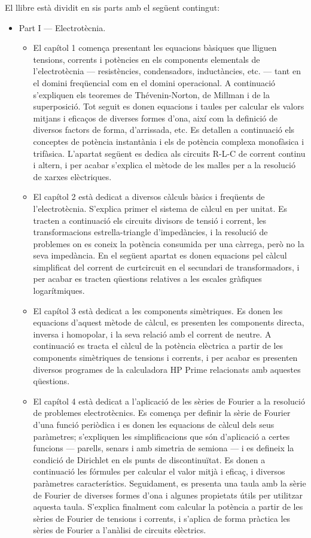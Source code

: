 	El llibre està dividit en sis parts amb el següent contingut:
	\begin{itemize}
		\item Part I --- Electrotècnia. 
		\begin{itemize}
			\item El capítol 1 comença presentant les equacions bàsiques que lliguen tensions, corrents i potències en els components elementals de l'electrotècnia --- resistències, condensadors, inductàncies, etc. --- tant en el domini freqüencial com en el domini operacional. A continuació s'expliquen els teoremes de Thévenin-Norton, de Millman i de la superposició. Tot seguit es donen equacions i taules per calcular els valors mitjans i eficaços de diverses formes d'ona, així com la definició de diversos factors de forma, d'arrissada, etc. Es detallen a continuació els conceptes de potència instantània i els de potència complexa monofàsica i trifàsica. L'apartat següent es dedica  als circuits R-L-C de corrent continu i altern, i per acabar s'explica el mètode de les malles per a la resolució de xarxes elèctriques.
			\item El capítol 2 està dedicat a diversos càlculs bàsics i freqüents de l'electrotècnia. S'explica primer el sistema de càlcul en per unitat. Es tracten a continuació els circuits  divisors de tensió i corrent,  les transformacions estrella-triangle d'impedàncies, i la resolució de problemes on es coneix la potència consumida per una càrrega, però no la seva impedància. En el següent apartat es donen equacions pel càlcul simplificat del corrent de curtcircuit en el secundari de transformadors, i per acabar es tracten  qüestions relatives a les  escales gràfiques logarítmiques.
			\item El capítol 3 està dedicat a les components simètriques. Es donen les equacions d'aquest mètode de càlcul, es presenten les components directa, inversa i homopolar, i la seva relació amb el corrent de neutre. A continuació es tracta el càlcul de la potència elèctrica a partir de les components simètriques de tensions i corrents, i per acabar es presenten diversos programes de la calculadora \textsf{HP Prime} relacionats amb aquestes qüestions.
			\item El capítol 4 està dedicat a l'aplicació de les sèries de Fourier a la resolució de problemes electrotècnics. Es comença per definir la sèrie de Fourier d'una funció periòdica i es donen les equacions de càlcul dels seus paràmetres; s'expliquen  les simplificacions que són d'aplicació a certes funcions --- parells, senars i amb simetria de semiona --- i es defineix la condició de Dirichlet en els punts de discontinuïtat. Es donen a continuació les fórmules per calcular el valor mitjà i eficaç, i diversos paràmetres característics. Seguidament, es presenta una taula amb la sèrie de Fourier de diverses formes d'ona i algunes propietats útils per utilitzar aquesta taula. S'explica finalment com calcular la potència a partir de les sèries de Fourier de tensions i corrents, i s'aplica de forma pràctica les sèries de Fourier a l'anàlisi de circuits elèctrics.

\end{itemize}
\end{itemize}
